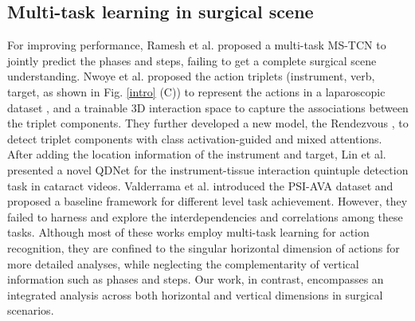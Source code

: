 \subsection{Multi-task learning in surgical scene}
For improving performance,  Ramesh et al. \cite{ramesh2021multi} proposed a multi-task MS-TCN to jointly predict the phases and steps, failing to get a complete surgical scene understanding.
Nwoye et al. proposed the action triplets (instrument, verb, target, as shown in Fig. \ref{intro} (C)) to represent the actions in a laparoscopic dataset \cite{nwoye2020recognition}, and a trainable 3D interaction space to capture the associations between the triplet components. They further developed a new model, the Rendezvous \cite{nwoye2022rendezvous}, to detect triplet components with class activation-guided and mixed attentions. After adding the location information of the instrument and target, Lin et al. \cite{lin2022instrument, lin2024instrument} presented a novel QDNet for the instrument-tissue interaction quintuple detection task in cataract videos. Valderrama et al. \cite{valderrama2022towards} introduced the PSI-AVA dataset and proposed a baseline framework for different level task achievement. However, they failed to harness and explore the interdependencies and correlations among these tasks. Although most of these works employ multi-task learning for action recognition, they are confined to the singular horizontal dimension of actions for more detailed analyses, while neglecting the complementarity of vertical information such as phases and steps.  Our work, in contrast, encompasses an integrated analysis across both horizontal and vertical dimensions in surgical scenarios.